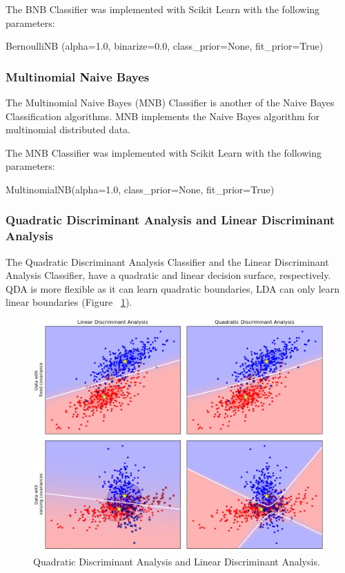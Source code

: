 The BNB Classifier was implemented with Scikit Learn with the following parameters:

\begin{tcolorbox}
\begin{center}
	BernoulliNB (alpha=1.0, binarize=0.0, class\_prior=None, fit\_prior=True)
\end{center}
\end{tcolorbox}

\subsubsection*{Multinomial Naive Bayes}

The Multinomial Naive Bayes (MNB) Classifier is another of the Naive Bayes Classification algorithms. MNB implements the Naive Bayes algorithm for multinomial distributed data.

The MNB Classifier was implemented with Scikit Learn with the following parameters:

\begin{tcolorbox}
\begin{center}
	MultinomialNB(alpha=1.0, class\_prior=None, fit\_prior=True)
\end{center}
\end{tcolorbox}

\subsubsection*{Quadratic Discriminant Analysis and Linear Discriminant Analysis}

The Quadratic Discriminant Analysis Classifier and the Linear Discriminant Analysis Classifier, have a quadratic and linear decision surface, respectively. QDA is more flexible as it can learn quadratic boundaries, LDA can only learn linear boundaries (Figure ~\ref{fig:qdalda}). 

\begin{figure}[h!]
\centering
\includegraphics[width=1\textwidth]{design_and_methodology/qda_and_lda.png}
\caption{\label{fig:qdalda} Quadratic Discriminant Analysis and Linear Discriminant Analysis.}
\end{figure}

